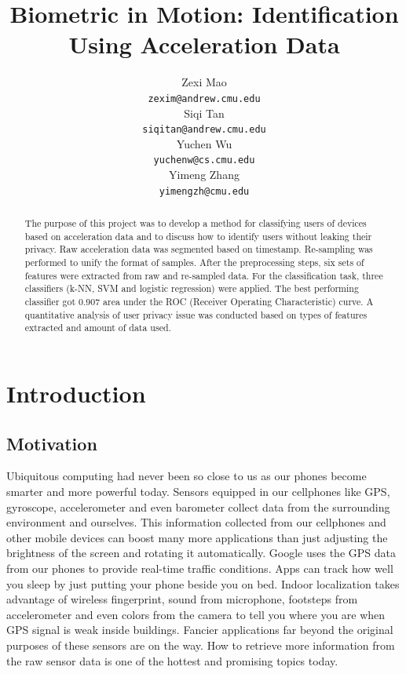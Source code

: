 \documentclass{article} %
\title{Biometric in Motion: Identification Using Acceleration Data}
\author{
Zexi Mao\\
\texttt{zexim@andrew.cmu.edu} \\
\And
Siqi Tan \\
\texttt{siqitan@andrew.cmu.edu} \\
\AND
Yuchen Wu\\
\texttt{yuchenw@cs.cmu.edu} \\
\And
Yimeng Zhang \\
\texttt{yimengzh@cmu.edu} \\
}
\begin{document}
\maketitle

\begin{abstract}
The purpose of this project was to develop a method for classifying users of devices based on acceleration data and to discuss how to identify users without leaking their privacy. Raw acceleration data was segmented based on timestamp. Re-sampling was performed to unify the format of samples. After the preprocessing steps, six sets of features were extracted from raw and re-sampled data. For the classification task, three classifiers (k-NN, SVM and logistic regression) were applied. The best performing classifier got 0.907 area under the ROC (Receiver Operating Characteristic) curve. A quantitative analysis of user privacy issue was conducted based on types of features extracted and amount of data used.
\end{abstract}

\section{Introduction}

\subsection{Motivation}

Ubiquitous computing had never been so close to us as our phones become smarter and more powerful today. Sensors equipped in our cellphones like GPS, gyroscope, accelerometer and even barometer collect data from the surrounding environment and ourselves. This information collected from our cellphones and other mobile devices can boost many more applications than just adjusting the brightness of the screen and rotating it automatically. Google uses the GPS data from our phones to provide real-time traffic conditions. Apps can track how well you sleep by just putting your phone beside you on bed. Indoor localization takes advantage of wireless fingerprint, sound from microphone, footsteps from accelerometer and even colors from the camera to tell you where you are when GPS signal is weak inside buildings. Fancier applications far beyond the original purposes of these sensors are on the way. How to retrieve more information from the raw sensor data is one of the hottest and promising topics today.
\end{document}
